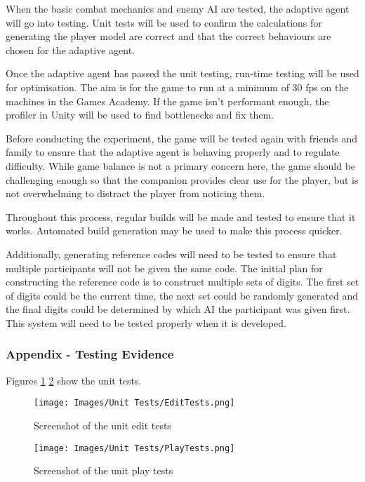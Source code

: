 \documentclass{IEEEtran}
\begin{document}
When the basic combat mechanics and enemy AI are tested, the adaptive agent will go into testing. Unit tests will be used to confirm the calculations for generating the player model are correct and that the correct behaviours are chosen for the adaptive agent.

Once the adaptive agent has passed the unit testing, run-time testing will be used for optimisation. The aim is for the game to run at a minimum of 30 fps on the machines in the Games Academy. If the game isn't performant enough, the profiler in Unity will be used to find bottlenecks and fix them.

Before conducting the experiment, the game will be tested again with friends and family to ensure that the adaptive agent is behaving properly and to regulate difficulty. While game balance is not a primary concern here, the game should be challenging enough so that the companion provides clear use for the player, but is not overwhelming to distract the player from noticing them.

Throughout this process, regular builds will be made and tested to ensure that it works. Automated build generation may be used to make this process quicker.

Additionally, generating reference codes will need to be tested to ensure that multiple participants will not be given the same code. The initial plan for constructing the reference code is to construct multiple sets of digits. The first set of digits could be the current time, the next set could be randomly generated and the final digits could be determined by which AI the participant was given first. This system will need to be tested properly when it is developed.


\subsubsection{Appendix - Testing Evidence}
\label{AppendixUnitTests}

Figures \ref{fig:AppendixUnitEditTests} \ref{fig:AppendixUnitPlayTests} show the unit tests.

\begin{figure}[!h]
  \centering
  \texttt{[image: Images/Unit Tests/EditTests.png]}
  
\caption{Screenshot of the unit edit tests}
\label{fig:AppendixUnitEditTests}
\end{figure}

\begin{figure}[!h]
  \centering
  \texttt{[image: Images/Unit Tests/PlayTests.png]}
  
\caption{Screenshot of the unit play tests}
\label{fig:AppendixUnitPlayTests}
\end{figure}
\end{document}

